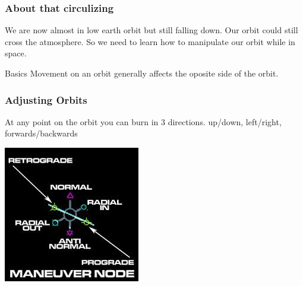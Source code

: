 {
%
\begin{frame}
\end{frame}
\begin{frame}
    \frametitle{About that circulizing}
    \begin{block}{}
        We are now almost in low earth orbit but still falling down. Our orbit could still cross the atmosphere.
        So we need to learn how to manipulate our orbit while in space.
    \end{block}
    \begin{block}{Basics}
        Movement on an orbit generally affects the oposite side of the orbit.
    \end{block}
\end{frame}
\begin{frame}
    \frametitle{Adjusting Orbits}
    \begin{block}{}
        \begin{center}
            At any point on the orbit you can burn in 3 directions. up/down, left/right, forwards/backwards
        \end{center}
    \end{block}
    \begin{block}{}
        \begin{center}
            \includegraphics[scale=0.8]{images/maneuver_node.jpg}

\end{center}
\end{block}
\end{frame}}
